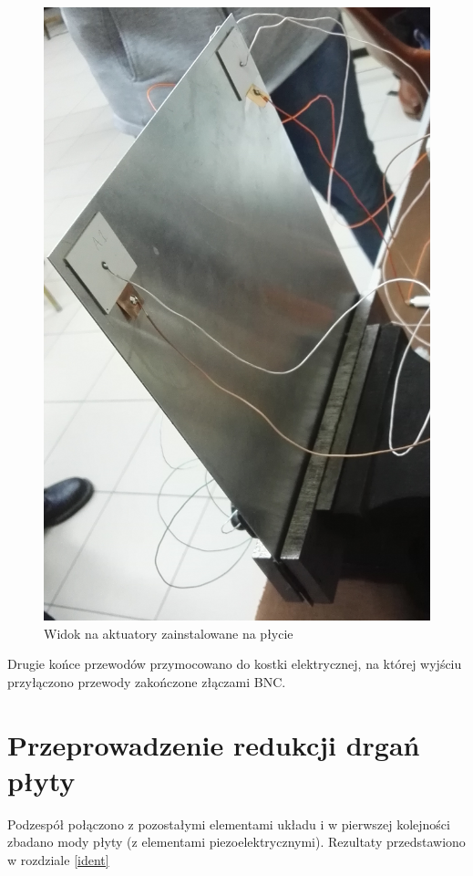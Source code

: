 \documentclass[polish,a4paper,11pt]{mwart}
\let\Oldsection\section
\renewcommand{\section}{\FloatBarrier\Oldsection}
\begin{document}
\begin{figure}[!tbh]
  \centering
  \includegraphics[width=\textwidth]{./bitgraphics/plate2.jpg}
  \caption{Widok na aktuatory zainstalowane na płycie}
  \label{fig:plate2}
\end{figure}

Drugie końce przewodów przymocowano do kostki elektrycznej, na której wyjściu
przyłączono przewody zakończone złączami BNC.

\section{Przeprowadzenie redukcji drgań płyty}

Podzespół połączono z pozostałymi elementami układu i w pierwszej kolejności
zbadano mody płyty (z elementami piezoelektrycznymi). Rezultaty przedstawiono 
w rozdziale \ref{ident}
\end{document}

